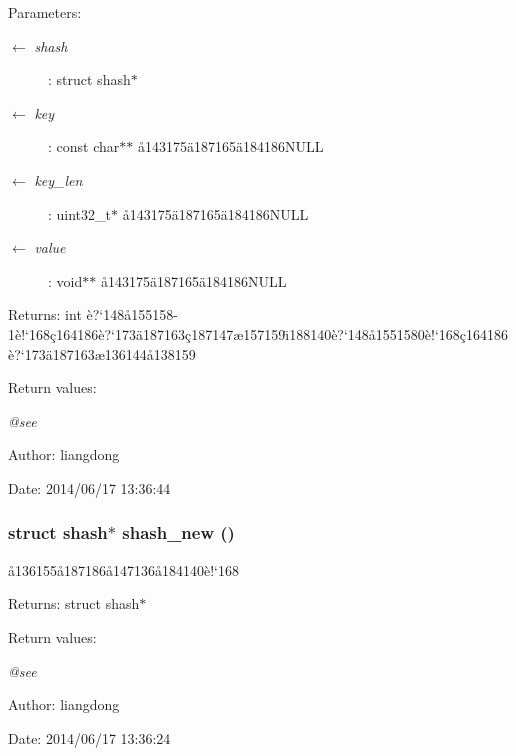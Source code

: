 \begin{Desc}
\item[Parameters:]
\begin{description}
\item[\mbox{$\leftarrow$} {\em shash}]: struct shash$\ast$ \item[\mbox{$\leftarrow$} {\em key}]: const char$\ast$$\ast$ \aa{}143175\"{a}187165\"{a}184186NULL \item[\mbox{$\leftarrow$} {\em key\_\-len}]: uint32\_\-t$\ast$ \aa{}143175\"{a}187165\"{a}184186NULL \item[\mbox{$\leftarrow$} {\em value}]: void$\ast$$\ast$ \aa{}143175\"{a}187165\"{a}184186NULL \end{description}
\end{Desc}
\begin{Desc}
\item[Returns:]int \`{e}?`148\aa{}155158-1\`{e}!`168\c{c}164186\`{e}?`173\"{a}187163\c{c}187147\ae{}157159\"{\i}188140\`{e}?`148\aa{}1551580\`{e}!`168\c{c}164186\`{e}?`173\"{a}187163\ae{}136144\aa{}138159 \end{Desc}
\begin{Desc}
\item[Return values:]
\begin{description}
\item[{\em @see}]\end{description}
\end{Desc}
\begin{Desc}
\item[Author:]liangdong \end{Desc}
\begin{Desc}
\item[Date:]2014/06/17 13:36:44 \end{Desc}
\subsubsection{\setlength{\rightskip}{0pt plus 5cm}struct shash$\ast$ shash\_\-new ()}\label{shash_8c_a0}


\aa{}136155\aa{}187186\aa{}147136\aa{}184140\`{e}!`168 

\begin{Desc}
\item[Returns:]struct shash$\ast$ \end{Desc}
\begin{Desc}
\item[Return values:]
\begin{description}
\item[{\em @see}]\end{description}
\end{Desc}
\begin{Desc}
\item[Author:]liangdong \end{Desc}
\begin{Desc}
\item[Date:]2014/06/17 13:36:24 \end{Desc}
